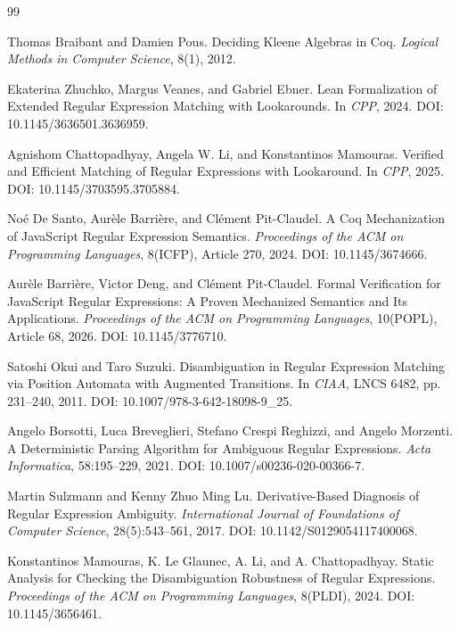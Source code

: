 \documentclass[UTF8,a4paper,12pt]{ctexart}
\begin{document}
\begin{thebibliography}{99}

Thomas Braibant and Damien Pous.
\newblock Deciding Kleene Algebras in Coq.
\newblock \emph{Logical Methods in Computer Science}, 8(1), 2012.

Ekaterina Zhuchko, Margus Veanes, and Gabriel Ebner.
\newblock Lean Formalization of Extended Regular Expression Matching with Lookarounds.
\newblock In \emph{CPP}, 2024.
\newblock DOI: 10.1145/3636501.3636959.

Agnishom Chattopadhyay, Angela W. Li, and Konstantinos Mamouras.
\newblock Verified and Efficient Matching of Regular Expressions with Lookaround.
\newblock In \emph{CPP}, 2025.
\newblock DOI: 10.1145/3703595.3705884.

No\'e De Santo, Aur\`ele Barri\`ere, and Cl\'ement Pit-Claudel.
\newblock A Coq Mechanization of JavaScript Regular Expression Semantics.
\newblock \emph{Proceedings of the ACM on Programming Languages}, 8(ICFP), Article 270, 2024.
\newblock DOI: 10.1145/3674666.

Aur\`ele Barri\`ere, Victor Deng, and Cl\'ement Pit-Claudel.
\newblock Formal Verification for JavaScript Regular Expressions: A Proven Mechanized Semantics and Its Applications.
\newblock \emph{Proceedings of the ACM on Programming Languages}, 10(POPL), Article 68, 2026.
\newblock DOI: 10.1145/3776710.

Satoshi Okui and Taro Suzuki.
\newblock Disambiguation in Regular Expression Matching via Position Automata with Augmented Transitions.
\newblock In \emph{CIAA}, LNCS 6482, pp. 231--240, 2011.
\newblock DOI: 10.1007/978-3-642-18098-9\_25.

Angelo Borsotti, Luca Breveglieri, Stefano Crespi Reghizzi, and Angelo Morzenti.
\newblock A Deterministic Parsing Algorithm for Ambiguous Regular Expressions.
\newblock \emph{Acta Informatica}, 58:195--229, 2021.
\newblock DOI: 10.1007/s00236-020-00366-7.

Martin Sulzmann and Kenny Zhuo Ming Lu.
\newblock Derivative-Based Diagnosis of Regular Expression Ambiguity.
\newblock \emph{International Journal of Foundations of Computer Science}, 28(5):543--561, 2017.
\newblock DOI: 10.1142/S0129054117400068.

Konstantinos Mamouras, K. Le Glaunec, A. Li, and A. Chattopadhyay.
\newblock Static Analysis for Checking the Disambiguation Robustness of Regular Expressions.
\newblock \emph{Proceedings of the ACM on Programming Languages}, 8(PLDI), 2024.
\newblock DOI: 10.1145/3656461.


\end{thebibliography}
\end{document}
